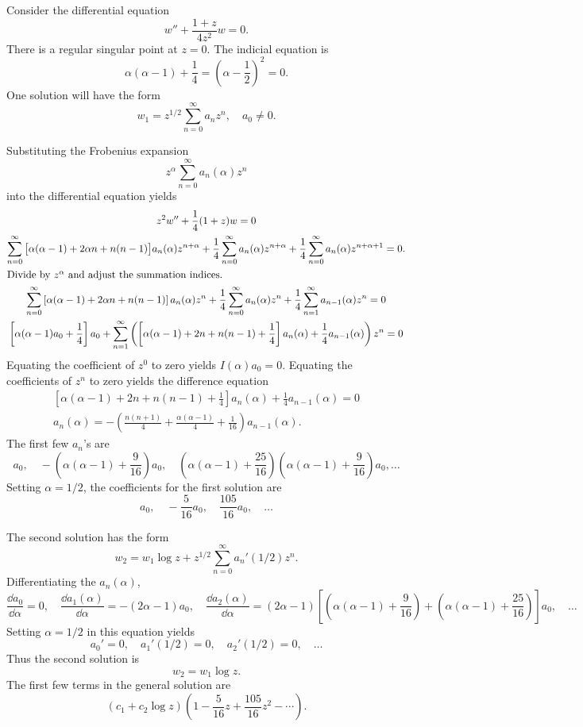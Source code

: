 \begin{Example}
  Consider the differential equation
  \[ w'' + \frac{1+z}{4z^2} w = 0.\]
  There is a regular singular point at $z = 0$.  The indicial equation is
  \[ \alpha(\alpha-1) + \frac{1}{4} = \left(\alpha-\frac{1}{2}\right)^2 = 0.\]
  One solution will have the form
  \[ w_1 = z^{1/2} \sum_{n=0}^\infty a_n z^n , \quad a_0 \neq 0.\]

  Substituting the Frobenius expansion
  \[z^\alpha \sum_{n=0}^\infty a_n(\alpha) z^n\]
  into the differential equation yields
  \begin{gather*}
    z^2 w'' + \frac{1}{4}(1+z) w = 0 \\
    \sum_{n=0}^\infty \big[\alpha(\alpha-1) + 2 \alpha n + n(n-1)  \big]
    a_n(\alpha) z^{n+\alpha}
    + \frac{1}{4} \sum_{n=0}^\infty a_n(\alpha) z^{n+\alpha}
    + \frac{1}{4} \sum_{n=0}^\infty a_n(\alpha) z^{n+\alpha+1} = 0. \\
    \intertext{Divide by $z^\alpha$ and adjust the summation indices.}
    \sum_{n=0}^\infty \left[\alpha(\alpha-1) + 2 \alpha n + n(n-1)  \right]
    a_n(\alpha) z^n
    + \frac{1}{4} \sum_{n=0}^\infty a_n(\alpha) z^n
    + \frac{1}{4} \sum_{n=1}^\infty a_{n-1}(\alpha) z^n = 0 \\
    \left[\alpha(\alpha-1)a_0 + \frac{1}{4}\right]a_0
    + \sum_{n=1}^\infty \left(\left[\alpha(\alpha-1) + 2 n + n(n-1) 
        + \frac{1}{4}\right]a_n(\alpha) + \frac{1}{4} a_{n-1}(\alpha)
    \right) z^n=0
  \end{gather*}
  Equating the coefficient of $z^0$ to zero yields $I(\alpha) a_0 = 0$.
  Equating the coefficients of $z^n$ to zero yields the difference equation
  \begin{gather*}
    \left[\alpha(\alpha-1) + 2 n + n(n-1) 
      + \frac{1}{4}\right]a_n(\alpha) + \frac{1}{4} a_{n-1}(\alpha) = 0 \\
    a_n(\alpha) = - \left(\frac{n(n+1)}{4} + \frac{\alpha(\alpha-1)}{4} 
      + \frac{1}{16} \right)a_{n-1}(\alpha).
  \end{gather*}
  The first few $a_n$'s are
  \[ a_0,\quad -\left(\alpha(\alpha-1) + \frac{9}{16} \right)a_0, \quad
  \left(\alpha(\alpha-1) + \frac{25}{16} \right)
  \left(\alpha(\alpha-1) + \frac{9}{16} \right)a_0,\ldots \]
  Setting $\alpha=1/2$, the coefficients for the first solution are
  \[a_0,\quad  -\frac{5}{16} a_0,\quad \frac{105}{16}a_0,\quad \ldots\]

  The second solution has the form
  \[ w_2 = w_1 \log z 
  + z^{1/2} \sum_{n=0}^\infty a_n'(1/2) z^n.\]
  Differentiating the $a_n(\alpha)$, 
  \[ \frac{\dd a_0}{\dd \alpha} = 0, 
  \quad  \frac{\dd a_1(\alpha)}{\dd \alpha} = -(2\alpha - 1)a_0,\quad  
  \frac{\dd a_2(\alpha)}{\dd \alpha} = 
  (2\alpha-1)\left[\left(\alpha(\alpha-1) + \frac{9}{16} \right)+ 
    \left(\alpha(\alpha-1) + \frac{25}{16} \right)
  \right]a_0,\quad \ldots\]
  Setting $\alpha = 1/2$ in this equation yields
  \[ a_0' = 0,\quad a_1'(1/2) = 0,\quad a_2'(1/2) = 0,\quad \ldots\]
  Thus the second solution is
  \[ w_2 = w_1 \log z .\]
  The first few terms in the general solution are
  \[ \boxed{(c_1 + c_2 \log z)\left(1 - \frac{5}{16}z + \frac{105}{16}z^2 
      - \cdots \right).}\]
\end{Example}
